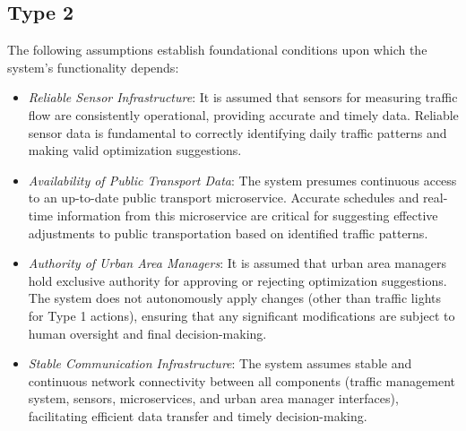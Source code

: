 \documentclass[a4paper,12pt]{article}
\begin{document}
\subsection*{Type 2}
The following assumptions establish foundational conditions upon which the system's functionality depends:
\begin{itemize}
    \item \textit{Reliable Sensor Infrastructure}: It is assumed that sensors for measuring traffic flow are consistently operational, providing accurate and timely data. Reliable sensor data is fundamental to correctly identifying daily traffic patterns and making valid optimization suggestions.
    \item \textit{Availability of Public Transport Data}: The system presumes continuous access to an up-to-date public transport microservice. Accurate schedules and real-time information from this microservice are critical for suggesting effective adjustments to public transportation based on identified traffic patterns.
    \item \textit{Authority of Urban Area Managers}: It is assumed that urban area managers hold exclusive authority for approving or rejecting optimization suggestions. The system does not autonomously apply changes (other than traffic lights for Type 1 actions), ensuring that any significant modifications are subject to human oversight and final decision-making.
    \item \textit{Stable Communication Infrastructure}: The system assumes stable and continuous network connectivity between all components (traffic management system, sensors, microservices, and urban area manager interfaces), facilitating efficient data transfer and timely decision-making.
\end{itemize}
\end{document}
